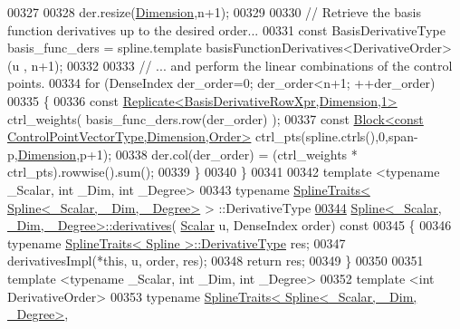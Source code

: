 \begin{DoxyCode}
00327 
00328     der.resize(\hyperlink{group___splines___module_a82c233f1d4719bc52397d64a6c96c5b0a25366e5e79da5355d259a71096d8d8a7}{Dimension},n+1);
00329 
00330     \textcolor{comment}{// Retrieve the basis function derivatives up to the desired order...    }
00331     \textcolor{keyword}{const} BasisDerivativeType basis\_func\_ders = spline.template basisFunctionDerivatives<DerivativeOrder>(u
      , n+1);
00332 
00333     \textcolor{comment}{// ... and perform the linear combinations of the control points.}
00334     \textcolor{keywordflow}{for} (DenseIndex der\_order=0; der\_order<n+1; ++der\_order)
00335     \{
00336       \textcolor{keyword}{const} \hyperlink{group___core___module_class_eigen_1_1_replicate}{Replicate<BasisDerivativeRowXpr,Dimension,1>} 
      ctrl\_weights( basis\_func\_ders.row(der\_order) );
00337       \textcolor{keyword}{const} \hyperlink{group___core___module_class_eigen_1_1_block}{Block<const ControlPointVectorType,Dimension,Order>}
       ctrl\_pts(spline.ctrls(),0,span-p,\hyperlink{group___splines___module_a82c233f1d4719bc52397d64a6c96c5b0a25366e5e79da5355d259a71096d8d8a7}{Dimension},p+1);
00338       der.col(der\_order) = (ctrl\_weights * ctrl\_pts).rowwise().sum();
00339     \}
00340   \}
00341 
00342   \textcolor{keyword}{template} <\textcolor{keyword}{typename} \_Scalar, \textcolor{keywordtype}{int} \_Dim, \textcolor{keywordtype}{int} \_Degree>
00343   \textcolor{keyword}{typename} \hyperlink{struct_eigen_1_1_spline_traits}{SplineTraits< Spline<\_Scalar, \_Dim, \_Degree>} >
      ::DerivativeType
\hyperlink{group___splines___module_a196730cf190dfa16907db888277e5aed}{00344}     \hyperlink{group___splines___module_a196730cf190dfa16907db888277e5aed}{Spline<\_Scalar, \_Dim, \_Degree>::derivatives}(
      \hyperlink{group___splines___module_a8cafd78b564825c76fbb3419653d9742}{Scalar} u, DenseIndex order)\textcolor{keyword}{ const}
00345 \textcolor{keyword}{  }\{
00346     \textcolor{keyword}{typename} \hyperlink{struct_eigen_1_1_spline_traits}{SplineTraits< Spline >::DerivativeType} res;
00347     derivativesImpl(*\textcolor{keyword}{this}, u, order, res);
00348     \textcolor{keywordflow}{return} res;
00349   \}
00350 
00351   \textcolor{keyword}{template} <\textcolor{keyword}{typename} \_Scalar, \textcolor{keywordtype}{int} \_Dim, \textcolor{keywordtype}{int} \_Degree>
00352   \textcolor{keyword}{template} <\textcolor{keywordtype}{int} DerivativeOrder>
00353   \textcolor{keyword}{typename} \hyperlink{struct_eigen_1_1_spline_traits}{SplineTraits< Spline<\_Scalar, \_Dim, \_Degree>}, 

\end{DoxyCode}
